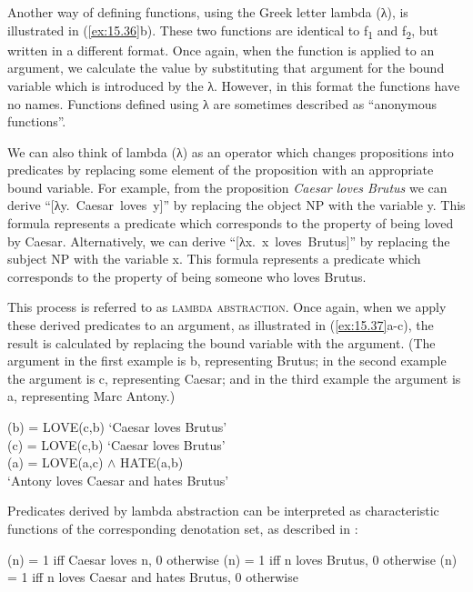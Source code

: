 Another way of defining functions, using the Greek letter lambda (λ), is illustrated in (\ref{ex:15.36}b). These two functions are identical to f\textsubscript{1} and f\textsubscript{2}, but written in a different format. Once again, when the function is applied to an argument, we calculate the value by substituting that argument for the bound variable which is introduced by the λ. However, in this format the functions have no names. Functions defined using λ are sometimes described as “anonymous functions”.



We can also think of lambda (λ) as an operator which changes propositions into predicates by replacing some element of the proposition with an appropriate bound variable. For example, from the proposition \textit{Caesar loves Brutus} we can derive “[λy.~Caesar~loves~y]” by replacing the object NP with the variable y. This formula represents a predicate which corresponds to the property of being loved by Caesar. Alternatively, we can derive “[λx.~x~loves~Brutus]” by replacing the subject NP with the variable x. This formula represents a predicate which corresponds to the property of being someone who loves Brutus.



This process is referred to as \textsc{lambda abstraction}. Once again, when we apply these derived predicates to an argument, as illustrated in (\ref{ex:15.37}a-c), the result is calculated by replacing the bound variable with the argument. (The argument in the first example is b, representing Brutus; in the second example the argument is c, representing Caesar; and in the third example the argument is a, representing Marc Antony.)


\ea \label{ex:15.37}
\ea [λy. LOVE(c,y)](b) = LOVE(c,b) ‘Caesar loves Brutus’\\
\ex [λx. LOVE(x,b)](c) = LOVE(c,b) ‘Caesar loves Brutus’\\
(a) = LOVE(a,c) $\wedge$ HATE(a,b)\\
\glt  ‘Antony loves Caesar and hates Brutus’
\z \z


Predicates derived by lambda abstraction can be interpreted as characteristic functions of the corresponding denotation set, as described in :


\ea \label{ex:15.38} 
\ea   [λy. LOVE(c,y)](n) =  1 iff Caesar loves n,  0 otherwise
\ex   [λx. LOVE(x,b)](n) =  1 iff n loves Brutus,  0 otherwise
(n) =  1 iff n loves Caesar and hates Brutus,  0 otherwise
\z \z


